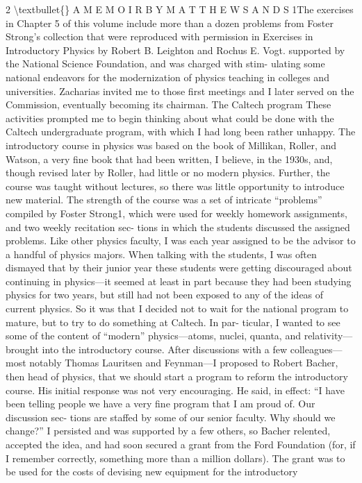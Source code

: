\documentclass[10pt,oneside]{article}
\begin{document}
2 \textbackslash{}textbullet\{\} A  M E M O I R  B Y  M A T T H E W  S A N D S 1The exercises in Chapter 5 of this volume include more than a dozen problems from Foster Strong’s collection that were reproduced with permission in Exercises in Introductory Physics by Robert B. Leighton and Rochus E. Vogt. supported by the National Science Foundation, and was charged with stim- ulating some national endeavors for the modernization of physics teaching in colleges and universities. Zacharias invited me to those first meetings and I later served on the Commission, eventually becoming its chairman. The Caltech program These activities prompted me to begin thinking about what could be done with the Caltech undergraduate program, with which I had long been rather unhappy. The introductory course in physics was based on the book of Millikan, Roller, and Watson, a very fine book that had been written, I believe, in the 1930s, and, though revised later by Roller, had little or no modern physics. Further, the course was taught without lectures, so there was little opportunity to introduce new material. The strength of the course was a set of intricate “problems” compiled by Foster Strong1, which were used for weekly homework assignments, and two weekly recitation sec- tions in which the students discussed the assigned problems. Like other physics faculty, I was each year assigned to be the advisor to a handful of physics majors. When talking with the students, I was often dismayed that by their junior year these students were getting discouraged about continuing in physics---it seemed at least in part because they had been studying physics for two years, but still had not been exposed to any of the ideas of current physics. So it was that I decided not to wait for the national program to mature, but to try to do something at Caltech. In par- ticular, I wanted to see some of the content of “modern” physics---atoms, nuclei, quanta, and relativity---brought into the introductory course. After discussions with a few colleagues---most notably Thomas Lauritsen and Feynman---I proposed to Robert Bacher, then head of physics, that we should start a program to reform the introductory course. His initial response was not very encouraging. He said, in effect: “I have been telling people we have a very fine program that I am proud of. Our discussion sec- tions are staffed by some of our senior faculty. Why should we change?” I persisted and was supported by a few others, so Bacher relented, accepted the idea, and had soon secured a grant from the Ford Foundation (for, if I remember correctly, something more than a million dollars). The grant was to be used for the costs of devising new equipment for the introductory\par
\end{document}
